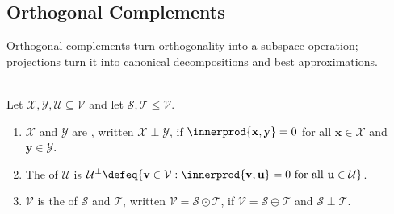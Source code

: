 \subsection{Orthogonal Complements}

%

Orthogonal complements turn orthogonality into a subspace operation; projections turn it into canonical decompositions and best approximations.

\begin{definition} \label{def:orthogonal-subsets-and-direct-sums}\label{def:orthogonal-complement} \\
Let $\mathcal{X},\mathcal{Y},\mathcal{U}\subseteq\mathcal{V}$ and let $\mathcal{S},\mathcal{T}\leq\mathcal{V}$.
\begin{enumerate}[label=\roman*.]
\setlength{\itemsep}{0pt}
\item $\mathcal{X}$ and $\mathcal{Y}$ are , written $\mathcal{X}\perp\mathcal{Y}$, if $\innerprod{\mathbf{x},\mathbf{y}}=0$ for all $\mathbf{x}\in\mathcal{X}$ and $\mathbf{y}\in\mathcal{Y}$.
\item The  of $\mathcal{U}$ is $\mathcal{U}^{\perp}\defeq\{\mathbf{v}\in\mathcal{V}:\innerprod{\mathbf{v},\mathbf{u}}=0\text{ for all }\mathbf{u}\in\mathcal{U}\}$.
\item $\mathcal{V}$ is the  of $\mathcal{S}$ and $\mathcal{T}$, written $\mathcal{V}=\mathcal{S}\odot\mathcal{T}$, if $\mathcal{V}=\mathcal{S}\oplus\mathcal{T}$ and $\mathcal{S}\perp\mathcal{T}$.
\end{enumerate}
\end{definition}

